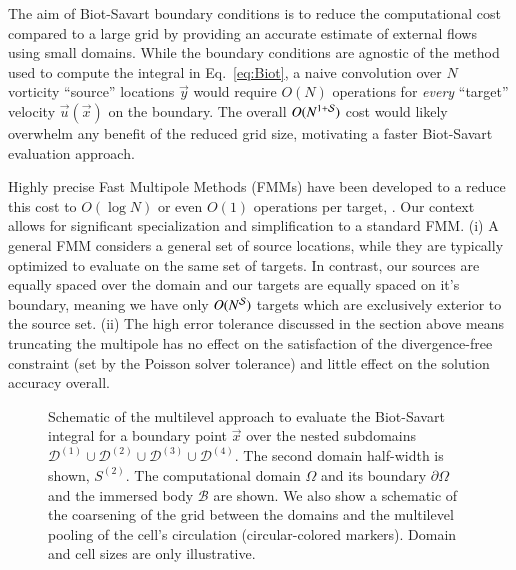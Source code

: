 \documentclass[final,1p,times]{elsarticle}
\begin{document}
The aim of Biot-Savart boundary conditions is to reduce the computational cost compared to a large grid by providing an accurate estimate of external flows using small domains. While the boundary conditions are agnostic of the method used to compute the integral in Eq.~\ref{eq:Biot}, a naive convolution over $N$ vorticity ``source'' locations $\vec y$ would require $O(N)$ operations for \textit{every} ``target'' velocity $\vec u(\vec x)$ on the boundary. The overall $O(N^{1+\cal S})$ cost would likely overwhelm any benefit of the reduced grid size, motivating a faster Biot-Savart evaluation approach.


Highly precise Fast Multipole Methods (FMMs) have been developed to a reduce this cost to $O(\log N)$ or even $O(1)$ operations per target, \cite{Greencard1987ASimulations,Ying2004ADimensions, Fong2009TheMethod}. Our context allows for significant specialization and simplification to a standard FMM. (i) A general FMM considers a general set of source locations, while they are typically optimized to evaluate on the same set of targets. In contrast, our sources are equally spaced over the domain and our targets are equally spaced on it's boundary, meaning we have only $O(N^{\cal S})$ targets which are exclusively exterior to the source set. (ii) The high error tolerance discussed in the section above means truncating the multipole has no effect on the satisfaction of the divergence-free constraint (set by the Poisson solver tolerance) and little effect on the solution accuracy overall.

\begin{figure}
    \centering
    \def\svgwidth{0.7\columnwidth}
    
    \caption{Schematic of the multilevel approach to evaluate the Biot-Savart integral for a boundary point $\vec x$ over the nested subdomains $\mathcal{D}^{(1)} \cup \mathcal{D}^{(2)} \cup \mathcal{D}^{(3)} \cup \mathcal{D}^{(4)}$. The second domain half-width is shown, ${S}^{(2)}$. The computational domain $\Omega$ and its boundary $\partial\Omega$ and the immersed body $\mathcal{B}$ are shown. We also show a schematic of the coarsening of the grid between the domains and the multilevel pooling of the cell's circulation (circular-colored markers). Domain and cell sizes are only illustrative.}
    \label{Fig_2}
\end{figure}
\end{document}
